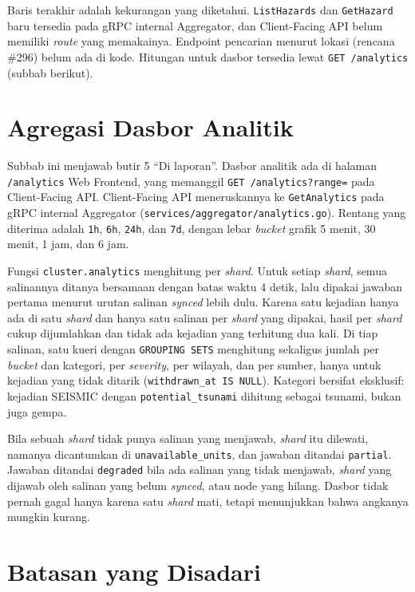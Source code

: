 Baris terakhir adalah kekurangan yang diketahui. \texttt{ListHazards} dan \texttt{GetHazard} baru tersedia pada gRPC internal Aggregator, dan Client-Facing API belum memiliki \textit{route} yang memakainya. Endpoint pencarian menurut lokasi (rencana \#296) belum ada di kode. Hitungan untuk dasbor tersedia lewat \texttt{GET /analytics} (subbab berikut).

\section{Agregasi Dasbor Analitik}

Subbab ini menjawab butir 5 ``Di laporan''. Dasbor analitik ada di halaman \texttt{/analytics} Web Frontend, yang memanggil \texttt{GET /analytics?range=} pada Client-Facing API. Client-Facing API meneruskannya ke \texttt{GetAnalytics} pada gRPC internal Aggregator (\texttt{services/aggregator/analytics.go}). Rentang yang diterima adalah \texttt{1h}, \texttt{6h}, \texttt{24h}, dan \texttt{7d}, dengan lebar \textit{bucket} grafik 5 menit, 30 menit, 1 jam, dan 6 jam.

Fungsi \texttt{cluster.analytics} menghitung per \textit{shard}. Untuk setiap \textit{shard}, semua salinannya ditanya bersamaan dengan batas waktu 4 detik, lalu dipakai jawaban pertama menurut urutan salinan \textit{synced} lebih dulu. Karena satu kejadian hanya ada di satu \textit{shard} dan hanya satu salinan per \textit{shard} yang dipakai, hasil per \textit{shard} cukup dijumlahkan dan tidak ada kejadian yang terhitung dua kali. Di tiap salinan, satu kueri dengan \texttt{GROUPING SETS} menghitung sekaligus jumlah per \textit{bucket} dan kategori, per \textit{severity}, per wilayah, dan per sumber, hanya untuk kejadian yang tidak ditarik (\texttt{withdrawn\_at IS NULL}). Kategori bersifat eksklusif: kejadian SEISMIC dengan \texttt{potential\_tsunami} dihitung sebagai tsunami, bukan juga gempa.

Bila sebuah \textit{shard} tidak punya salinan yang menjawab, \textit{shard} itu dilewati, namanya dicantumkan di \texttt{unavailable\_units}, dan jawaban ditandai \texttt{partial}. Jawaban ditandai \texttt{degraded} bila ada salinan yang tidak menjawab, \textit{shard} yang dijawab oleh salinan yang belum \textit{synced}, atau node yang hilang. Dasbor tidak pernah gagal hanya karena satu \textit{shard} mati, tetapi menunjukkan bahwa angkanya mungkin kurang.

\section{Batasan yang Disadari}

